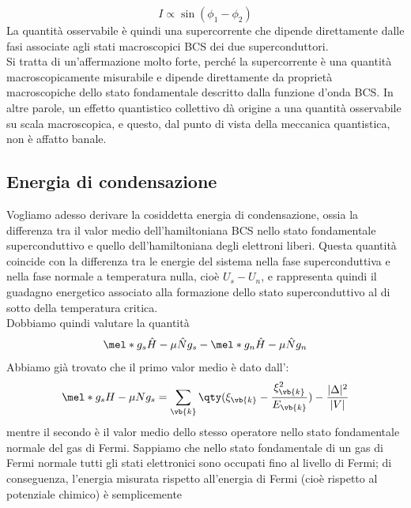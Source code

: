 \begin{equation*}
   I \propto \sin(\phi_1-\phi_2)
\end{equation*}
La quantità osservabile è quindi una supercorrente che dipende direttamente dalle fasi associate agli stati macroscopici BCS dei due superconduttori.\\
Si tratta di un'affermazione molto forte, perché la supercorrente è una quantità macroscopicamente misurabile e dipende direttamente da proprietà macroscopiche dello stato fondamentale descritto dalla funzione d'onda BCS. In altre parole, un effetto quantistico collettivo dà origine a una quantità osservabile su scala macroscopica, e questo, dal punto di vista della meccanica quantistica, non è affatto banale.
\subsection{Energia di condensazione}
Vogliamo adesso derivare la cosiddetta energia di condensazione, ossia la differenza tra il valor medio dell'hamiltoniana BCS nello stato fondamentale superconduttivo e quello dell'hamiltoniana degli elettroni liberi. Questa quantità coincide con la differenza tra le energie del sistema nella fase superconduttiva e nella fase normale a temperatura nulla, cioè $U_s-U_n$, e rappresenta quindi il guadagno energetico associato alla formazione dello stato superconduttivo al di sotto della temperatura critica.\\
Dobbiamo quindi valutare la quantità
\begin{equation*}
   \mel*{g_s}{\hat{H} - \mu \hat{N}}{g_s}
   -
   \mel*{g_n}{\hat{H} - \mu \hat{N}}{g_n}
\end{equation*}
Abbiamo già trovato che il primo valor medio è dato dall':
\begin{equation*}
   \mel*{g_s}{H - \mu N}{g_s}
   = \sum_{\vb{k}} \qty( \xi_{\vb{k}} - \frac{\xi^2_{\vb{k}}}{E_{\vb{k}}} ) - \frac{|\Delta|^2}{|V|}
\end{equation*}
mentre il secondo è il valor medio dello stesso operatore nello stato fondamentale normale del gas di Fermi. Sappiamo che nello stato fondamentale di un gas di Fermi normale tutti gli stati elettronici sono occupati fino al livello di Fermi; di conseguenza, l'energia misurata rispetto all'energia di Fermi (cioè rispetto al potenziale chimico) è semplicemente
